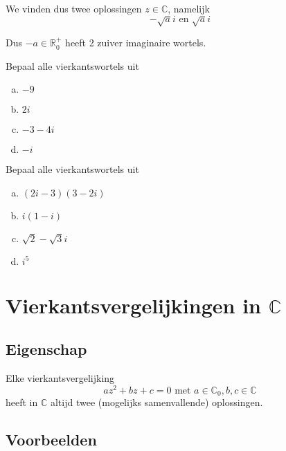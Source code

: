 \documentclass[12pt,twoside,a4paper]{article}
\begin{document}
We vinden dus twee oplossingen $z\in\mathbb{C}$, namelijk
$$-\sqrt{a}i \mbox{ en } \sqrt{a}i$$

Dus $-a\in\mathbb{R}^+_0$ heeft 2 zuiver imaginaire wortels.


\begin{oefening}
  Bepaal alle vierkantswortels uit
  \begin{multicols}{2}
  \begin{enumerate}[(a)]
    \itemsep 1em
  \item $-9$
  \item $2i$
  \item $-3-4i$
  \item $-i$
  \end{enumerate}
\end{multicols}
\end{oefening}

\begin{oefening}
  Bepaal alle vierkantswortels uit
  \begin{multicols}{2}
  \begin{enumerate}[(a)]
    \itemsep 1em
  \item $(2i-3)(3-2i)$
  \item $i(1-i)$
  \item $\sqrt{2}-\sqrt{3}i$
  \item $i^5$
  \end{enumerate}
\end{multicols}
\end{oefening}

\pagebreak
\section{Vierkantsvergelijkingen in $\mathbb{C}$}

\subsection{Eigenschap}

\begin{mdframed}
Elke vierkantsvergelijking
\[az^2+bz+c=0 \text{ met } a\in\mathbb{C}_0, b,c\in\mathbb{C}\]
heeft in $\mathbb{C}$ altijd twee (mogelijks samenvallende) oplossingen.
\end{mdframed}

\subsection{Voorbeelden}
\end{document}
